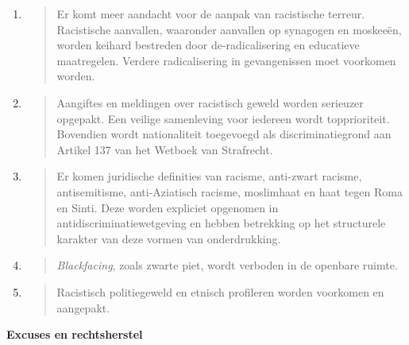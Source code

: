 \begin{enumerate}
\def\labelenumi{\arabic{enumi}.}
\item
  \begin{quote}
  Er komt meer aandacht voor de aanpak van racistische terreur.
  Racistische aanvallen, waaronder aanvallen op synagogen en moskeeën,
  worden keihard bestreden door de-radicalisering en educatieve
  maatregelen. Verdere radicalisering in gevangenissen moet voorkomen
  worden.
  \end{quote}
\item
  \begin{quote}
  Aangiftes en meldingen over racistisch geweld worden serieuzer
  opgepakt. Een veilige samenleving voor iedereen wordt topprioriteit.
  Bovendien wordt nationaliteit toegevoegd als discriminatiegrond aan
  Artikel 137 van het Wetboek van Strafrecht.
  \end{quote}
\item
  \begin{quote}
  Er komen juridische definities van racisme, anti-zwart racisme,
  antisemitisme, anti-Aziatisch racisme, moslimhaat en haat tegen Roma
  en Sinti. Deze worden expliciet opgenomen in
  antidiscriminatiewetgeving en hebben betrekking op het structurele
  karakter van deze vormen van onderdrukking.
  \end{quote}
\item
  \begin{quote}
  \emph{Blackfacing}, zoals zwarte piet, wordt verboden in de openbare
  ruimte.
  \end{quote}
\item
  \begin{quote}
  Racistisch politiegeweld en etnisch profileren worden voorkomen en
  aangepakt.
  \end{quote}
\end{enumerate}

\textbf{Excuses en rechtsherstel}

